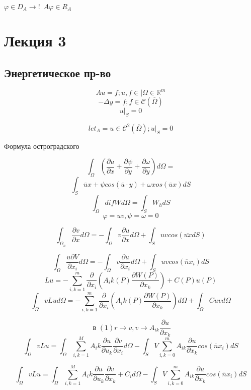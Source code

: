 \documentclass[12pt, a4paper]{article}
\begin{document}
$\varphi \in D_A \rightarrow ! \enspace A\varphi \in R_A$

\newpage

\section{Лекция 3}

\subsection{Энергетическое пр-во}

\[ Au=f; u,f \in | \Omega \in \mathbb{R}^m \]
\[ -\Delta y = f; f \in \mathcal{C}(\overline{\Omega}) \]
\[ u|_S = 0 \]

\[ let_A = {u \in \mathcal{C }^2 (\overline{\Omega}); u|_S = 0} \]

Формула остроградского

\[ \int_{\Omega}^{}(\frac{\partial u}{\partial x } + \frac{\partial \psi }{\partial y} + \frac{\partial \omega}{\partial y}) d\Omega = \]
\[ \int_{S }^{} \overline{u }x + \psi cos(\overline{u }\cdot y) + \omega xos (\overline{u }x ) dS\]
\[  \]
\[ \int_{\Omega}^{} dif W d\Omega = \int_{S}^{} W_h dS \]
\[ \varphi = uv, \psi = \omega = 0 \]

\[ \int_{{\Omega}_n}^{} \frac{\partial v }{\partial x } d \Omega = - \int_{\Omega}^{} v \frac{\partial u }{\partial x } d \Omega + \int_{S}^{} uv cos (\overline{u x } dS) \]

\[ \int_{\Omega }^{} \frac{u \partial V }{\partial x_i} d \Omega = - \int_{\Omega }^{} v \frac{\partial u}{\partial x_i} d \Omega + \int_{S }^{} uv cos(\overline{n }x_i ) dS\]
\[ Lu = - \sum_{i,k =1}^{m } \frac{\partial }{\partial x_i} (A_ik (P ) \frac{ \partial W(P)}{\partial x_k}) + C(P) u(P) \]
\[ \int_{\Omega}^{} v Lu d \Omega = - \sum_{i,k =1}^{m } \frac{\partial }{\partial x_i} (A_ik (P ) \frac{ \partial W(P)}{\partial x_k}) d \Omega + \int_{\Omega}^{}C u v d \Omega  \]

\[ \textrm{ в } (1) r \rightarrow v, v \rightarrow A_{ik} \frac{\partial u }{\partial x_k } \]
\[ \int_{\Omega}^{} v L u  = \int_{\Omega}^{} \sum_{i,k = 1}^{M }A_ik \frac{\partial u }{\partial u_k} \frac{\partial v }{\partial x_i} d\Omega - \int_{S }^{} V \sum_{i,k =0}^{m} A_{ik} \frac{\partial u}{\partial x_k } cos(\overline{n }x_i ) dS\]

\[ \int_{\Omega}^{} v L u  = \int_{\Omega}^{} \sum_{i,k = 1}^{M }A_ik \frac{\partial u }{\partial u_k} \frac{\partial v }{\partial x_k} + C_i d\Omega - \int_{S }^{} V \sum_{i,k =0}^{m} A_{ik} \frac{\partial u}{\partial x_k } cos(\overline{n }x_i ) dS\]
\end{document}
